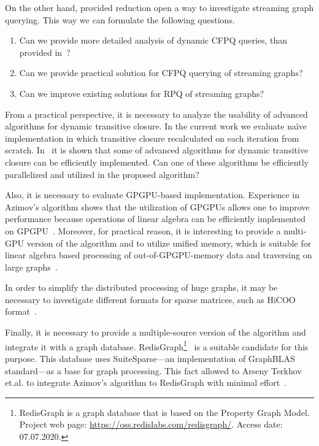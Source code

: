 On the other hand, provided reduction open a way to investigate streaming graph querying.
This way we can formulate the following questions.
\begin{enumerate}
\item Can we provide more detailed analysis of dynamic CFPQ queries, than provided in~\cite{10.1007/978-3-662-54458-7_16}?
\item Can we provide practical solution for CFPQ querying of streaming graphs?
\item Can we improve existing solutions for RPQ of streaming graphs?
\end{enumerate}

From a practical perspective, it is necessary to analyze the usability of advanced algorithms for dynamic transitive closure.
In the current work we evaluate na{\"i}ve implementation in which transitive closure recalculated on each iteration from scratch.
In~\cite{cs6345} it is shown that some of advanced algorithms for dynamic transitive closure can be efficiently implemented.
Can one of these algorithms be efficiently parallelized and utilized in the proposed algorithm?

Also, it is necessary to evaluate GPGPU-based implementation.
Experience in Azimov's algorithm shows that the utilization of GPGPUs allows one to improve performance because operations of linear algebra can be efficiently implemented on GPGPU~\cite{Mishin:2019:ECP:3327964.3328503,10.1145/3398682.3399163}. 
Moreover, for practical reason, it is interesting to provide a multi-GPU version of the algorithm and to utilize unified memory, which is suitable for linear algebra based processing of out-of-GPGPU-memory data and traversing on large graphs~\cite{8946118,10.14778/3384345.3384358}.

In order to simplify the distributed processing of huge graphs, it may be necessary to investigate different formats for sparse matrices, such as HiCOO format~\cite{10.5555/3291656.3291682}. 

Finally, it is necessary to provide a multiple-source version of the algorithm and integrate it with a graph database.
RedisGraph\footnote{RedisGraph is a graph database that is based on the Property Graph
Model. Project web page: \url{https://oss.redislabs.com/redisgraph/}. Access date:
07.07.2020.}~\cite{8778293} is a suitable candidate for this purpose.
This database uses SuiteSparse---an implementation of GraphBLAS standard---as a base for graph processing.
This fact allowed to Arseny Terkhov et.al.  to integrate Azimov's algorithm to RedisGraph with minimal effort~\cite{10.1145/3398682.3399163}.
